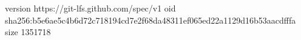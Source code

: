 version https://git-lfs.github.com/spec/v1
oid sha256:b5e6ae5c4b6d72c718194cd7e2f68da48311ef065ed22a1129d16b53aacdfffa
size 1351718
